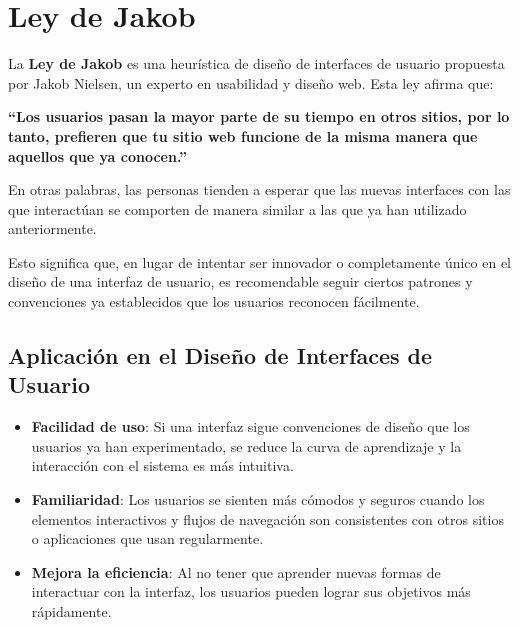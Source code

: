 	\clearpage
	\listoffigures



	\clearpage
	\vspace*{6pt}
	\begin{center}
		{\textbf{\huge \theTitle}}
	\end{center}
	\vspace*{8pt}


	\section{Ley de Jakob}

	La \textbf{Ley de Jakob} es una heurística de diseño de interfaces de usuario
	propuesta por Jakob Nielsen, un experto en usabilidad y diseño web. Esta ley
	afirma que:

	\textbf{``Los usuarios pasan la mayor parte de su tiempo en otros sitios, por lo
	tanto, prefieren que tu sitio web funcione de la misma manera que aquellos que
	ya conocen.''}

	En otras palabras, las personas tienden a esperar que las nuevas interfaces con
	las que interactúan se comporten de manera similar a las que ya han utilizado anteriormente.

	Esto significa que, en lugar de intentar ser innovador o completamente único en
	el diseño de una interfaz de usuario, es recomendable seguir ciertos patrones
	y convenciones ya establecidos que los usuarios reconocen fácilmente.

	\subsection{Aplicación en el Diseño de Interfaces de Usuario}

	\begin{itemize}
		\item \textbf{Facilidad de uso}: Si una interfaz sigue convenciones de diseño
			que los usuarios ya han experimentado, se reduce la curva de aprendizaje y
			la interacción con el sistema es más intuitiva.

		\item \textbf{Familiaridad}: Los usuarios se sienten más cómodos y seguros cuando
			los elementos interactivos y flujos de navegación son consistentes con otros
			sitios o aplicaciones que usan regularmente.

		\item \textbf{Mejora la eficiencia}: Al no tener que aprender nuevas formas de
			interactuar con la interfaz, los usuarios pueden lograr sus objetivos más
			rápidamente.
	\end{itemize}

